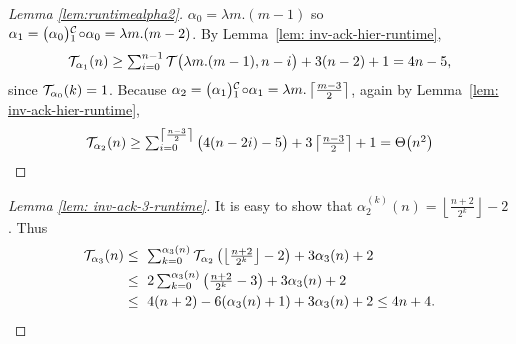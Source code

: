 \begin{proof}[Lemma \ref{lem:runtimealpha2}]
	$\alpha_0 = \lambda m.(m-1)$ so $\alpha_1 = \cdt{\big(\alpha_0\big)}{1}\circ \alpha_0 = \lambda m.(m - 2)$. By Lemma~\ref{lem: inv-ack-hier-runtime},
	\begin{equation*}
	\mathcal{T}_{\alpha_1}(n) \ge \textstyle \sum_{i=0}^{n-1} \mathcal{T}\big(\lambda m.(m-1), n - i\big) + 3(n - 2) + 1 = 4n - 5\text{,}
	\end{equation*}
	since $\mathcal{T}_{\alpha_0}(k) = 1$. Because $\alpha_2 = \cdt{\big(\alpha_1\big)}{1}\circ \alpha_1 = \lambda m.\left\lceil \frac{m-3}{2} \right\rceil$, again by Lemma~\ref{lem: inv-ack-hier-runtime},
	\begin{equation*}
	\mathcal{T}_{\alpha_2}(n)
	\ge \textstyle \sum_{i=0}^{\left\lceil \frac{n-3}{2} \right\rceil} \big(4(n-2i) - 5\big) + 3\left\lceil \frac{n-3}{2} \right\rceil + 1
	= \Theta\big(n^2\big)
	\end{equation*}
\end{proof}

\begin{proof}[Lemma \ref{lem: inv-ack-3-runtime}]
	It is easy to show that $\alpha_2^{(k)}(n) = \left\lfloor \frac{n+2}{2^k} \right\rfloor - 2$. Thus
	\begin{equation*}
	\begin{aligned}
		\runtime_{\alpha_3}(n)
		& \textstyle \le \ \sum_{k=0}^{\alpha_{3}(n)}\runtime_{\alpha_2}\left(\left\lfloor \frac{n+2}{2^k} \right\rfloor - 2\right) + 3\alpha_{3}(n) + 2 \\
		& \textstyle \le \ 2\sum_{k=0}^{\alpha_3(n)}\left(\frac{n+2}{2^k} - 3\right) + 3\alpha_3(n) + 2 \\
		& \le \ 4(n + 2) - 6(\alpha_3(n) + 1) + 3\alpha_3(n) + 2 \le 4n + 4.
	\end{aligned}
\end{equation*}
\end{proof}

